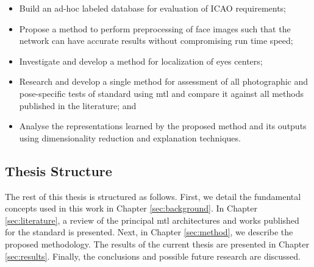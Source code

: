 \begin{itemize}
\item Build an ad-hoc labeled database for evaluation of ICAO requirements;
\item Propose a method to perform preprocessing of face images such that the network can have accurate results without compromising run time speed;
\item Investigate and develop a method for localization of eyes centers;
\item Research and develop a single method for assessment of all photographic and pose-specific tests of \icao standard using \acf{mtl} and compare it against all methods published in the literature; and
\item Analyse the representations learned by the proposed method and its outputs using dimensionality reduction and explanation techniques.
\end{itemize}
 
\subsection{Thesis Structure}
 
The rest of this thesis is structured as follows. First, we detail the fundamental concepts used in this work in Chapter \ref{sec:background}. In Chapter \ref{sec:literature}, a review of the principal \acl{mtl} architectures and works published for the \icao standard is presented. Next, in Chapter \ref{sec:method}, we describe the proposed methodology. The results of the current thesis are presented in Chapter \ref{sec:results}. Finally, the conclusions and possible future research are discussed.
 